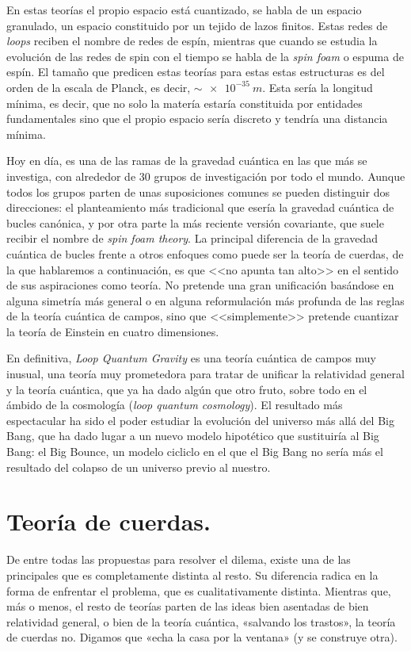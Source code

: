 \documentclass[11pt,a4paper,titlepage]{article}
\begin{document}
En estas teorías el propio espacio está cuantizado, se habla de un espacio granulado, un espacio constituido por  un tejido de lazos finitos. Estas redes de \emph{loops} reciben el nombre de redes de espín, mientras que cuando se estudia la evolución de las redes de spin con el tiempo se habla de la \emph{spin foam} o espuma de espín. El tamaño que predicen estas teorías para estas estas estructuras es del orden de la escala de Planck, es decir, $\sim\SI{e-35}{m}$. Esta sería la longitud mínima, es decir, que no solo la matería estaría constituida por entidades fundamentales sino que el propio espacio sería discreto y tendría una distancia mínima.

Hoy en día, es una de las ramas de la gravedad cuántica en las que más se investiga, con alrededor de 30 grupos de investigación por todo el mundo. Aunque todos los grupos parten de unas suposiciones comunes se pueden distinguir dos direcciones: el planteamiento más tradicional que esería la gravedad cuántica de bucles canónica, y por otra parte la más reciente versión covariante, que suele recibir el nombre de \emph{spin foam theory}. La principal diferencia de la gravedad cuántica de bucles frente a otros enfoques como puede ser la teoría de cuerdas, de la que hablaremos a continuación, es que <<no apunta tan alto>> en el sentido de sus aspiraciones como teoría. No pretende una gran unificación basándose en alguna simetría más general o en alguna reformulación más profunda de las reglas de la teoría cuántica de campos, sino que <<simplemente>> pretende cuantizar la teoría de Einstein en cuatro dimensiones.

En definitiva, \textit{Loop Quantum Gravity} es una teoría cuántica de campos muy inusual, una teoría muy prometedora para tratar de unificar la relatividad general y la teoría cuántica, que ya ha dado algún que otro fruto, sobre todo en el ámbido de la cosmología (\emph{loop quantum cosmology}). El resultado más espectacular ha sido el poder estudiar la evolución del universo más allá del Big Bang, que ha dado lugar a un nuevo modelo hipotético que sustituiría al Big Bang: el Big Bounce, un modelo cicliclo en el que el Big Bang no sería más el resultado del colapso de un universo previo al nuestro.

%
%
%
%
\newpage
\section{Teoría de cuerdas.}

De entre todas las propuestas para resolver el dilema, existe una de las principales que es completamente distinta al resto. Su diferencia radica en la forma de enfrentar el problema, que es cualitativamente distinta. Mientras que, más o menos, el resto de teorías parten de las ideas bien asentadas de bien relatividad general, o bien de la teoría cuántica, «salvando los trastos», la teoría de cuerdas no. Digamos que «echa la casa por la ventana» (y se construye otra).
\end{document}
